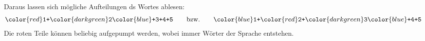 \begin{loesung}
\begin{center}
\begin{tikzpicture}[>=latex,thick]
\end{tikzpicture}
\end{center}
Daraus lassen sich mögliche Aufteilungen ds Wortes ablesen:
\[
\bgroup
\color{red}
\texttt{1+}
\color{darkgreen}
\texttt{2}
\color{blue}
\texttt{+3+4+5}
\egroup
\qquad\text{bzw.}\qquad
\bgroup
\color{blue}
\texttt{1+}
\color{red}
\texttt{2+}
\color{darkgreen}
\texttt{3}
\color{blue}
\texttt{+4+5}
\egroup
\]
Die roten Teile können beliebig aufgepumpt werden, wobei immer
Wörter der Sprache entstehen.
\end{loesung}



